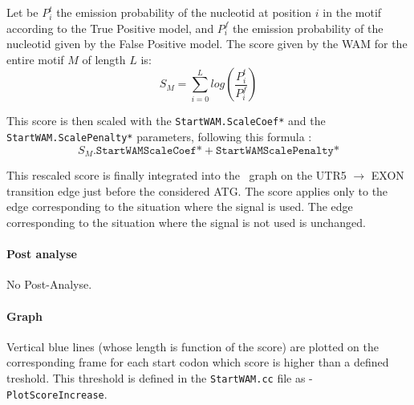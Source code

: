 Let be $P^t_i$ the emission probability of the nucleotid at position
$i$ in the motif according to the True Positive model, and $P^f_i$ the
emission probability of the nucleotid given by the False Positive
model. The score given by the WAM for the entire motif $M$ of length
$L$ is:
\[ S_M = \sum_{i=0}^{L} log\left(\frac{P^t_i}{P^f_i}\right) \]

This score is then scaled with the \texttt{StartWAM.ScaleCoef*} and the
\texttt{StartWAM.ScalePenalty*} parameters, following this formula :
$$S_M . \texttt{StartWAMScaleCoef*} + \texttt{StartWAMScalePenalty*}$$

This rescaled score is finally integrated into the \EuGene\ graph on
the UTR5 $\to$ EXON transition edge just before the considered ATG. The
score applies only to the edge corresponding to the situation where
the signal is used. The edge corresponding to the situation where the
signal is not used is unchanged.

\paragraph{Post analyse}

No Post-Analyse.

\paragraph{Graph}

Vertical blue lines (whose length is function of the score) are
plotted on the corresponding frame for each start codon which score is
higher than a defined treshold. This threshold is defined in the
\texttt{StartWAM.cc} file as -\texttt{PlotScoreIncrease}.
